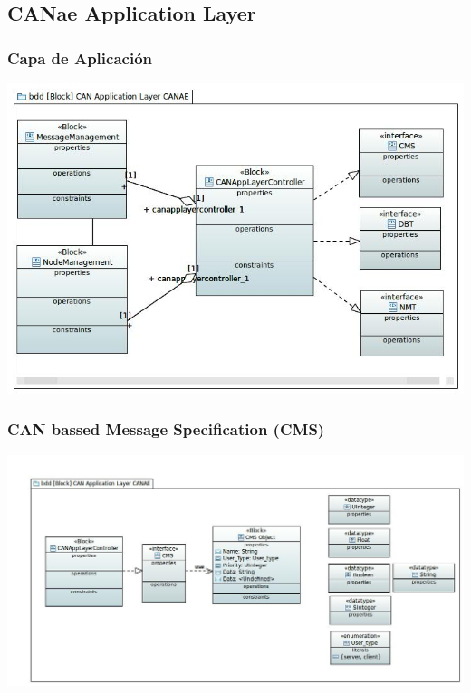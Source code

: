 \subsection{CANae Application Layer}
\begin{frame}
	\frametitle{Capa de Aplicación}
	\centering
	\includegraphics[scale=0.4]{images/CAN_Application_Layer_CANAE.jpg}
\end{frame}

\begin{frame}
	\frametitle{CAN bassed Message Specification (CMS)}
	\centering
	\includegraphics[scale=0.3]{images/CMS.JPG}
\end{frame}

